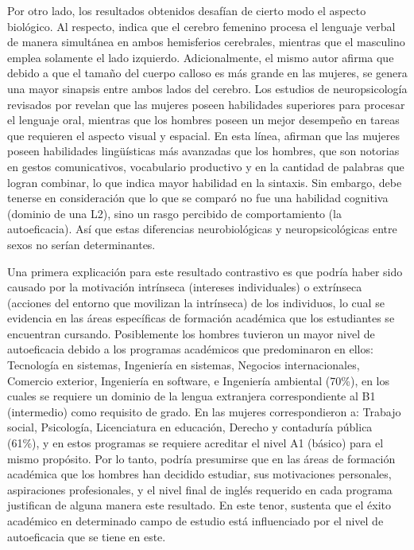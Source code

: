 \documentclass[spanish]{textolivre}
\begin{document}
Por otro lado, los resultados obtenidos desafían de cierto modo el aspecto biológico. Al respecto, \textcite{zaidi_gender_2010} indica que el cerebro femenino procesa el lenguaje verbal de manera simultánea en ambos hemisferios cerebrales, mientras que el masculino emplea solamente el lado izquierdo. Adicionalmente, el mismo autor afirma que debido a que el tamaño del cuerpo calloso es más grande en las mujeres, se genera una mayor sinapsis entre ambos lados del cerebro. Los estudios de neuropsicología revisados por \textcite{lopez_rua_sex_2006} revelan que las mujeres poseen habilidades superiores para procesar el lenguaje oral, mientras que los hombres poseen un mejor desempeño en tareas que requieren el aspecto visual y espacial. En esta línea, \textcite{eriksson_differences_2012} afirman que las mujeres poseen habilidades lingüísticas más avanzadas que los hombres, que son notorias en gestos comunicativos, vocabulario productivo y en la cantidad de palabras que logran combinar, lo que indica mayor habilidad en la sintaxis. Sin embargo, debe tenerse en consideración que lo que se comparó no fue una habilidad cognitiva (dominio de una L2), sino un rasgo percibido de comportamiento (la autoeficacia). Así que estas diferencias neurobiológicas y neuropsicológicas entre sexos no serían determinantes.

Una primera explicación para este resultado contrastivo es que podría haber sido causado por la motivación intrínseca (intereses individuales) o extrínseca (acciones del entorno que movilizan la intrínseca) de los individuos, lo cual se evidencia en las áreas específicas de formación académica que los estudiantes se encuentran cursando. Posiblemente los hombres tuvieron un mayor nivel de autoeficacia debido a los programas académicos que predominaron en ellos: Tecnología en sistemas, Ingeniería en sistemas, Negocios internacionales, Comercio exterior, Ingeniería en software, e Ingeniería ambiental (70\%), en los cuales se requiere un dominio de la lengua extranjera correspondiente al B1 (intermedio) como requisito de grado. En las mujeres correspondieron a: Trabajo social, Psicología, Licenciatura en educación, Derecho y contaduría pública (61\%), y en estos programas se requiere acreditar el nivel A1 (básico) para el mismo propósito. Por lo tanto, podría presumirse que en las áreas de formación académica que los hombres han decidido estudiar, sus motivaciones personales, aspiraciones profesionales, y el nivel final de inglés requerido en cada programa justifican de alguna manera este resultado. En este tenor, \textcite{mwaura_gender_2021} sustenta que el éxito académico en determinado campo de estudio está influenciado por el nivel de autoeficacia que se tiene en este. 
\end{document}
